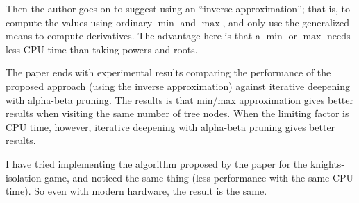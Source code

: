 \documentclass[11pt]{article}
\begin{document}
Then the author goes on to suggest using an ``inverse approximation''; that is, to compute the values using ordinary $\min$ and $\max$, and only use the generalized means to compute derivatives. The advantage here is that a $\min$ or $\max$ needs less CPU time than taking powers and roots.

The paper ends with experimental results comparing the performance of the proposed approach (using the inverse approximation) against iterative deepening with alpha-beta pruning. The results is that min/max approximation gives better results when visiting the same number of tree nodes. When the limiting factor is CPU time, however, iterative deepening with alpha-beta pruning gives better results.

I have tried implementing the algorithm proposed by the paper for the knights-isolation game, and noticed the same thing (less performance with the same CPU time). So even with modern hardware, the result is the same.
\end{document}
